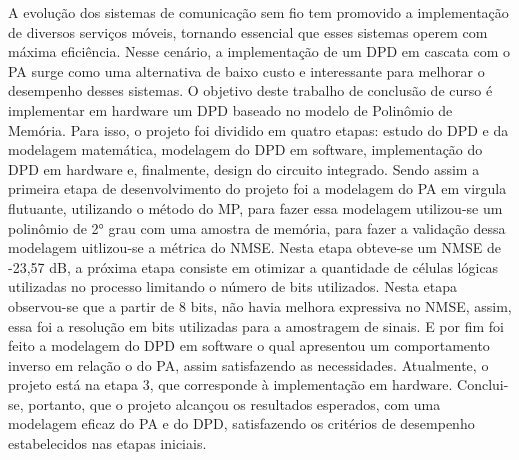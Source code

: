 A evolução dos sistemas de comunicação sem fio tem promovido a implementação de diversos serviços móveis, tornando essencial que esses sistemas operem com máxima eficiência. Nesse cenário, a implementação de um DPD em cascata com o PA surge como uma alternativa de baixo custo e interessante para melhorar o desempenho desses sistemas.
O objetivo deste trabalho de conclusão de curso é implementar em hardware um DPD baseado no modelo de Polinômio de Memória. Para isso, o projeto foi dividido em quatro etapas: estudo do DPD e da modelagem matemática, modelagem do DPD em software, implementação do DPD em hardware e, finalmente, design do circuito integrado.
Sendo assim a primeira etapa de desenvolvimento do projeto foi a modelagem do PA em virgula flutuante, utilizando o método do MP, para fazer essa modelagem utilizou-se um polinômio de 2° grau com uma amostra de memória, para fazer a validação dessa modelagem uitlizou-se a métrica do NMSE. Nesta etapa obteve-se um NMSE de -23,57 dB, a próxima etapa consiste em otimizar a quantidade de células lógicas utilizadas no processo limitando o número de bits utilizados. Nesta etapa observou-se que a partir de 8 bits, não havia melhora expressiva no NMSE, assim, essa foi a resolução em bits utilizadas para a amostragem de sinais. E por fim foi feito a modelagem do DPD em software o qual apresentou um comportamento inverso em relação o do PA, assim satisfazendo as necessidades.  Atualmente, o projeto está na etapa 3, que corresponde à implementação em hardware.  
Conclui-se, portanto, que o projeto alcançou os resultados esperados, com uma modelagem eficaz do PA e do DPD, satisfazendo os critérios de desempenho estabelecidos nas etapas iniciais.